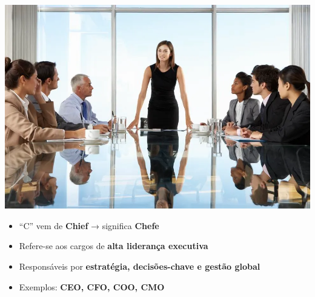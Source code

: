 \documentclass[
]{book}
\providecommand{\tightlist}{%
  \setlength{\itemsep}{0pt}\setlength{\parskip}{0pt}}
\begin{document}
\includegraphics{images/clipboard-1374704305.png}

\begin{itemize}
\tightlist
\item
  ``C'' vem de \textbf{Chief} → significa \textbf{Chefe}
\item
  Refere-se aos cargos de \textbf{alta liderança executiva}
\item
  Responsáveis por \textbf{estratégia, decisões-chave e gestão global}
\item
  Exemplos: \textbf{CEO, CFO, COO, CMO}
\end{itemize}
\end{document}
